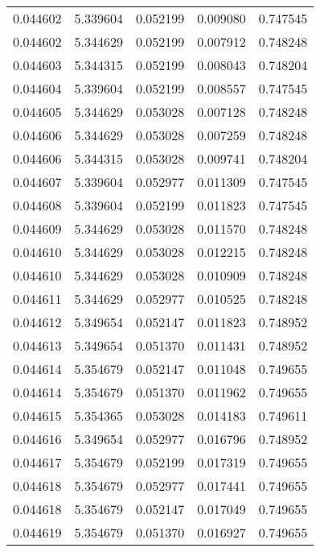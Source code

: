 \begin{tabular}{lrrrr}
0.044602    &  5.339604 &  0.052199 &  0.009080 &             0.747545 \\
0.044602    &  5.344629 &  0.052199 &  0.007912 &             0.748248 \\
0.044603    &  5.344315 &  0.052199 &  0.008043 &             0.748204 \\
0.044604    &  5.339604 &  0.052199 &  0.008557 &             0.747545 \\
0.044605    &  5.344629 &  0.053028 &  0.007128 &             0.748248 \\
0.044606    &  5.344629 &  0.053028 &  0.007259 &             0.748248 \\
0.044606    &  5.344315 &  0.053028 &  0.009741 &             0.748204 \\
0.044607    &  5.339604 &  0.052977 &  0.011309 &             0.747545 \\
0.044608    &  5.339604 &  0.052199 &  0.011823 &             0.747545 \\
0.044609    &  5.344629 &  0.053028 &  0.011570 &             0.748248 \\
0.044610    &  5.344629 &  0.053028 &  0.012215 &             0.748248 \\
0.044610    &  5.344629 &  0.053028 &  0.010909 &             0.748248 \\
0.044611    &  5.344629 &  0.052977 &  0.010525 &             0.748248 \\
0.044612    &  5.349654 &  0.052147 &  0.011823 &             0.748952 \\
0.044613    &  5.349654 &  0.051370 &  0.011431 &             0.748952 \\
0.044614    &  5.354679 &  0.052147 &  0.011048 &             0.749655 \\
0.044614    &  5.354679 &  0.051370 &  0.011962 &             0.749655 \\
0.044615    &  5.354365 &  0.053028 &  0.014183 &             0.749611 \\
0.044616    &  5.349654 &  0.052977 &  0.016796 &             0.748952 \\
0.044617    &  5.354679 &  0.052199 &  0.017319 &             0.749655 \\
0.044618    &  5.354679 &  0.052977 &  0.017441 &             0.749655 \\
0.044618    &  5.354679 &  0.052147 &  0.017049 &             0.749655 \\
0.044619    &  5.354679 &  0.051370 &  0.016927 &             0.749655 \\

\end{tabular}
